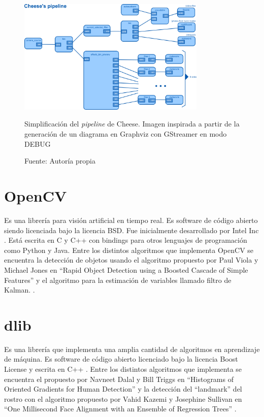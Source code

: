 \documentclass[a4paper,openright,12pt]{report}
\begin{document}
\begin{figure}
  \centering
    \includegraphics[angle=90,width=0.8\textwidth]{../images/cheese-pipeline.png}\par
  \caption{Simplificación del \textit{pipeline} de Cheese. Imagen inspirada a
  				 partir de la generación de un diagrama en Graphviz con GStreamer en
  				 modo DEBUG}
  \caption*{Fuente: Autoría propia}
\end{figure}

\section{OpenCV}
Es una librería para visión artificial en tiempo real. Es software de código
abierto siendo licenciada bajo la licencia BSD. Fue inicialmente desarrollado
por Intel Inc \cite{openCVAbout}. Está escrita en C y C++ con bindings para
otros lenguajes de programación como Python y Java. Entre los distintos
algoritmos que implementa OpenCV se encuentra la detección de objetos usando
el algoritmo propuesto por Paul Viola y Michael Jones en “Rapid Object Detection
using a Boosted Cascade of Simple Features” y el algoritmo para la estimación de
 variables llamado filtro de Kalman. \cite{openCVAbout}.
\section{dlib}
Es una librería que implementa una amplia cantidad de algoritmos en aprendizaje
de máquina. Es software de código abierto licenciado bajo la
licencia Boost License y escrita en C++ \cite{dlib}\cite{dlibLicense}. Entre
los distintos algoritmos que implementa se encuentra el propuesto por Navneet
Dalal y Bill Triggs en “Histograms of Oriented Gradients for Human Detection”
\cite{dlibHOG} y la detección del “landmark” del rostro con el algoritmo
propuesto por Vahid Kazemi y Josephine Sullivan en “One Millisecond
Face Alignment with an Ensemble of Regression Trees” \cite{dlib1ms}.
\end{document}
